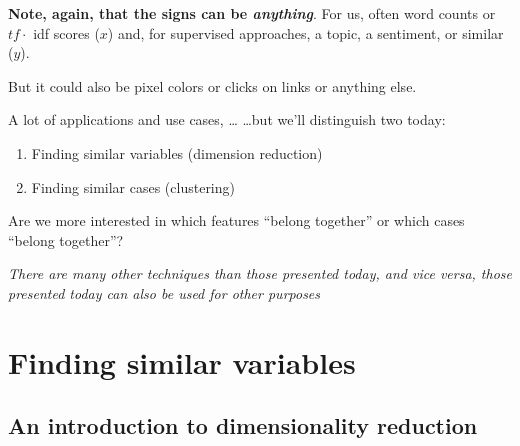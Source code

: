 \documentclass[compress]{beamer}
\begin{document}
\begin{frame}[plain]
\textbf{Note, again, that the  signs can be \emph{anything}}.
For us, often word counts or $tf\cdot$ idf scores ($x$) and, for supervised approaches, a topic, a sentiment, or similar ($y$). 

But it could also be pixel colors or clicks on links or anything else.
\begin{table}[]
\end{table}
\end{frame}



\begin{frame}{A lot of applications and use cases, \ldots}
\ldots but we'll distinguish two today:

\begin{enumerate}
\item Finding similar variables (dimension reduction)
\item Finding similar cases (clustering)
\end{enumerate}

\pause

Are we more interested in which features ``belong together'' or which cases ``belong together''? 

\emph{There are many other techniques than those presented today, and vice versa, those presented today can also be used for other purposes}

\end{frame}

\section{Finding similar variables}

\subsection{An introduction to dimensionality reduction}
\end{document}
